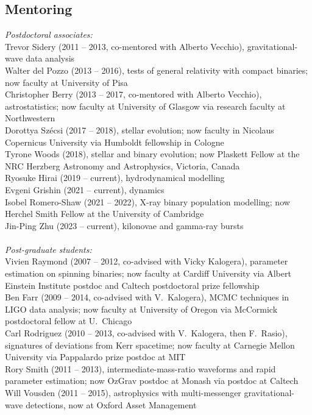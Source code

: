 \documentclass[margin,line]{res}
\begin{document}
\begin{resume}
\section{\sc Mentoring}
{\it Postdoctoral associates:}\\
Trevor Sidery (2011 -- 2013, co-mentored with Alberto Vecchio), gravitational-wave data analysis\\
Walter del Pozzo (2013 -- 2016), tests of general relativity with compact binaries; now faculty at University of Pisa\\
Christopher Berry (2013 -- 2017, co-mentored with Alberto Vecchio), astrostatistics; now faculty at University of Glasgow via research faculty at Northwestern\\
Dorottya Sz\'{e}csi (2017 -- 2018), stellar evolution; now faculty in Nicolaus Copernicus University via Humboldt fellowship in Cologne\\
Tyrone Woods (2018), stellar and binary evolution; now Plaskett Fellow at the NRC Herzberg Astronomy and Astrophysics, Victoria, Canada\\
Ryosuke Hirai (2019 -- current), hydrodynamical modelling\\
Evgeni Grishin (2021 -- current), dynamics\\
Isobel Romero-Shaw (2021 -- 2022), X-ray binary population modelling; now Herchel Smith Fellow at the University of Cambridge\\
Jin-Ping Zhu (2023 -- current), kilonovae and gamma-ray bursts\\
\\
{\it Post-graduate students:}\\
Vivien Raymond (2007 -- 2012, co-advised with Vicky Kalogera), parameter estimation on spinning binaries; now faculty at Cardiff University via Albert Einstein Institute postdoc and Caltech postdoctoral prize fellowship\\
Ben Farr (2009 -- 2014, co-advised with V.~Kalogera), MCMC techniques in LIGO data analysis; now faculty at University of Oregon via McCormick postdoctoral fellow at U.~Chicago\\
Carl Rodriguez (2010 -- 2013, co-advised with V.~Kalogera, then F.~Rasio), signatures of deviations from Kerr spacetime; now faculty at Carnegie Mellon University via Pappalardo prize postdoc at MIT\\
Rory Smith (2011 -- 2013), intermediate-mass-ratio waveforms and rapid parameter estimation; now OzGrav postdoc at Monash via postdoc at Caltech\\
Will Vousden (2011 -- 2015), astrophysics with multi-messenger gravitational-wave detections, now at Oxford Asset Management\\

\end{resume}
\end{document}
